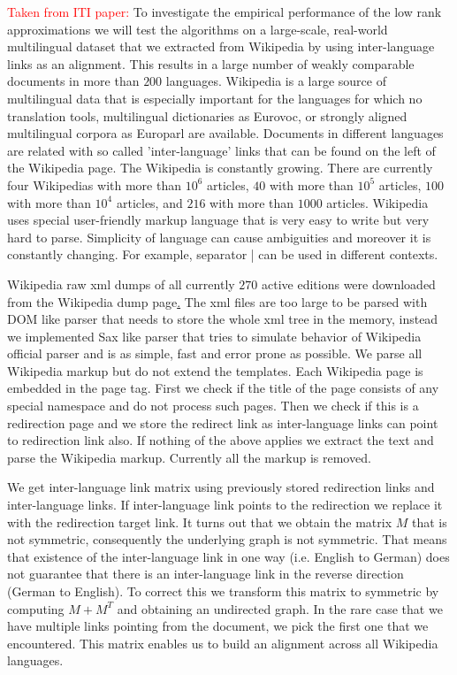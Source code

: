 \documentclass[twoside,11pt]{article}
\newcommand{\oldText}[1]{\textcolor{red}{#1:}\color{blue}}
\begin{document}
{\oldText{Taken from ITI paper}
To investigate the empirical performance of the low rank approximations we will test the algorithms on a large-scale, real-world multilingual dataset that we extracted from Wikipedia by using inter-language links as an alignment. This  results in a large number of weakly comparable documents in more than $200$ languages. Wikipedia is a large source of multilingual data that is especially important for the languages for which no translation tools, multilingual dictionaries as Eurovoc, or strongly aligned multilingual corpora as Europarl are available. Documents in different languages are related with so called 'inter-language' links that can be found on the left of the Wikipedia page. The Wikipedia is constantly growing. There are currently four Wikipedias with more than $10^6$ articles, $40$ with more than $10^5$ articles, $100$ with more than $10^4$ articles, and $216$ with more than $1000$ articles. Wikipedia uses special user-friendly markup language that is very easy to write but very hard to parse. Simplicity of language can cause ambiguities and moreover it is constantly changing. For example, separator | can be used in different contexts.

Wikipedia raw xml dumps of all currently $270$ active editions were downloaded from the Wikipedia dump page\href{http://dumps.wikimedia.org}. The xml files are too large to be parsed with DOM like parser that needs to store the whole xml tree in the memory, instead we implemented Sax like parser that tries to simulate behavior of Wikipedia official parser and is as simple, fast and error prone as possible. We parse all Wikipedia markup but do not extend the templates. Each Wikipedia page is embedded in the page tag. First we check if the title of the page consists of any special namespace and do not process such pages. Then we check if this is a redirection page and we store the redirect link as inter-language links can point to redirection link also. If nothing of the above applies we extract the text and parse the Wikipedia markup. Currently all the markup is removed.

We get inter-language link matrix using previously stored redirection links and inter-language links. If inter-language link points to the redirection we replace it with the redirection target link. It turns out that we obtain the matrix $M$ that is not symmetric, consequently the underlying graph is not symmetric. That means that existence of the inter-language link in one way (i.e. English to German) does not guarantee that there is an inter-language link in the reverse direction (German to English). To correct this we transform this matrix to symmetric by computing $M+M^T$ and obtaining an undirected graph. In the rare case that we have multiple links pointing from the document, we pick the first one that we encountered. This matrix enables us to build an alignment across all Wikipedia languages.
}
\end{document}
